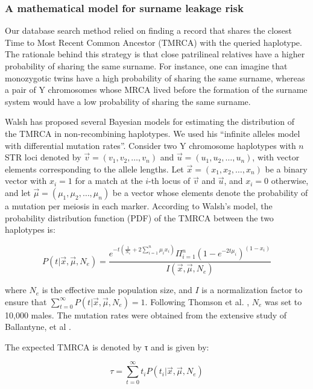 \subsubsection{A mathematical model for surname leakage risk}
Our database search method relied on finding a record that shares the closest Time to Most Recent Common Ancestor (TMRCA) with the queried haplotype. The rationale behind this strategy is that close patrilineal relatives have a higher probability of sharing the same surname. For instance, one can imagine that monozygotic twins have a high probability of sharing the same surname, whereas a pair of Y chromosomes whose MRCA lived before the formation of the surname system would have a low probability of sharing the same surname. 

Walsh \cite{Walsh2001} has proposed several Bayesian models for estimating the distribution of the TMRCA in non-recombining haplotypes. We used his ``infinite alleles model with differential mutation rates''. Consider two Y chromosome haplotypes with $n$ STR loci denoted by $\vec{v}=(v_1,v_2,\hdots,v_n)$ and $\vec{u}=(u_1,u_2,\hdots,u_n)$, with vector elements corresponding to the allele lengths. Let $\vec{x} = (x_1,x_2,\hdots,x_n)$ be a binary vector with $x_i=1$ for a match at the $i$-th locus of $\vec{v}$ and $\vec{u}$, and $x_i=0$ otherwise, and let $\vec{\mu}=(\mu_1,\mu_2,\hdots,\mu_n)$ be a vector whose elements denote the probability of a mutation per meiosis in each marker. According to Walsh’s model, the probability distribution function (PDF) of the TMRCA between the two haplotypes is:

\begin{equation}
\label{eq:sureq1}
P(t|\vec{x},\vec{\mu}, N_e) = \frac{e^{-t(\frac{1}{N_e}+2\sum_{i=1}^n\mu_ix_i)}\Pi_{i=1}^n(1-e^{-2t\mu_i})^{(1-x_i)}}{I(\vec{x},\vec{\mu},N_e)}
\end{equation}

where $N_e$ is the effective male population size, and $I$ is a normalization factor to ensure that $\sum_{t=0}^{\infty}P(t|\vec{x},\vec{\mu},N_e)=1$. Following Thomson et al. \cite{ThomsonPritchardShenEtAl2000}, $N_e$ was set to 10,000 males. The mutation rates were obtained from the extensive study of Ballantyne, et al \cite{BallantyneGoedbloedFangEtAl2010}.

The expected TMRCA is denoted by τ and is given by:

\begin{equation}
\tau = \sum_{t=0}^{\infty}t_i P(t_i|\vec{x}, \vec{\mu}, N_e)
\end{equation}

